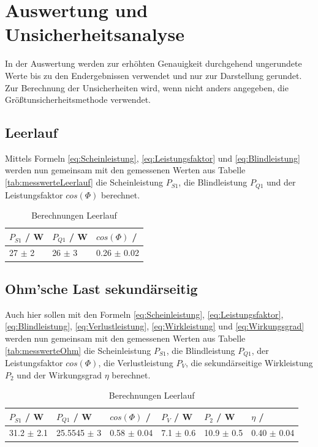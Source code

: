 \documentclass[12pt,a4paper,twoside]{article}
\begin{document}
\section{Auswertung und Unsicherheitsanalyse} %

In der Auswertung werden zur erhöhten Genauigkeit durchgehend ungerundete Werte bis zu den Endergebnissen verwendet und nur zur Darstellung gerundet. \\
Zur Berechnung der Unsicherheiten wird, wenn nicht anders angegeben, die Größtunsicherheitsmethode verwendet.

\subsection{Leerlauf}

Mittels Formeln \ref{eq:Scheinleistung}, \ref{eq:Leistungsfaktor} und \ref{eq:Blindleistung} werden nun gemeinsam mit den gemessenen Werten aus Tabelle \ref{tab:messwerteLeerlauf} die Scheinleistung $P_{S1}$, die Blindleistung $P_{Q1}$ und der Leistungsfaktor $cos(\Phi)$ berechnet.

\begin{table}[H]
    \centering
    \caption{Berechnungen Leerlauf}
    \label{tab:BerechnungenLeerlauf}
    \begin{tabular}{| l | l | l |}
        \hline
        $P_{S1}$ / W & $P_{Q1}$ / W & $cos(\Phi)$ / \\
        \hline
        27 $\pm$ 2 & 26 $\pm$ 3 & 0.26 $\pm$ 0.02 \\
        \hline
    \end{tabular}
\end{table}


\subsection{Ohm'sche Last sekundärseitig}

Auch hier sollen mit den Formeln \ref{eq:Scheinleistung}, \ref{eq:Leistungsfaktor}, \ref{eq:Blindleistung}, \ref{eq:Verlustleistung}, \ref{eq:Wirkleistung} und \ref{eq:Wirkungsgrad} werden nun gemeinsam mit den gemessenen Werten aus Tabelle \ref{tab:messwerteOhm} die Scheinleistung $P_{S1}$, die Blindleistung $P_{Q1}$, der Leistungsfaktor $cos(\Phi)$, die Verlustleistung $P_{V}$, die sekundärseitige Wirkleistung $P_{2}$ und der Wirkungsgrad $\eta$ berechnet.

\begin{table}[H]
    \centering
    \caption{Berechnungen Leerlauf}
    \label{tab:BerechnungenLeerlauf}
    \begin{tabular}{| l | l | l | l | l | l |}
        \hline
        $P_{S1}$ / W & $P_{Q1}$ / W & $cos(\Phi)$ / & $P_{V}$ / W & $P_{2}$ / W & $\eta$ / \\
        \hline
        31.2 $\pm$ 2.1 & 25.5545 $\pm$ 3 & 0.58 $\pm$ 0.04 & 7.1 $\pm$ 0.6 & 10.9 $\pm$ 0.5 & 0.40 $\pm$ 0.04 \\
        \hline
    \end{tabular}
\end{table}
\end{document}
